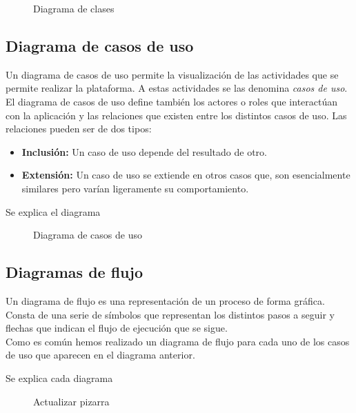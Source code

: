{\color{red}{\huge PROVISIONAL}}

\begin{landscape}
\begin{figure}[!h]
\centering
\clases
\caption{Diagrama de clases}
\end{figure}
\end{landscape}

\subsection{Diagrama de casos de uso}
Un diagrama de casos de uso permite la visualización de las actividades que se permite realizar la plataforma. A estas actividades se las denomina \textit{casos de uso}. El diagrama de casos de uso define también los actores o roles que interactúan con la aplicación y las relaciones que existen entre los distintos casos de uso. Las relaciones pueden ser de dos tipos:

\begin{itemize}
	\item \textbf{Inclusión:} Un caso de uso depende del resultado de otro.
	\item \textbf{Extensión:} Un caso de uso se extiende en otros casos que, son esencialmente similares pero varían ligeramente su comportamiento.
\end{itemize}

\color{red} Se explica el diagrama\color{black}

\begin{landscape}
\begin{figure}[!h]
\centering
\casos
\caption{Diagrama de casos de uso}
\end{figure}
\end{landscape}

\subsection{Diagramas de flujo}
Un diagrama de flujo es una representación de un proceso de forma gráfica. Consta de una serie de símbolos que representan los distintos pasos a seguir y flechas que indican el flujo de ejecución que se sigue.\\

Como es común hemos realizado un diagrama de flujo para cada uno de los casos de uso que aparecen en el diagrama anterior.

\color{red} Se explica cada diagrama\color{black}


\begin{figure}[!h]
\centering
\actualizarPizarra
\caption{Actualizar pizarra}
\end{figure}
\newpage

